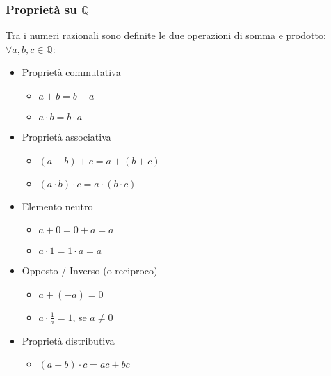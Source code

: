 \documentclass[a4paper,12pt, oneside]{book}
\begin{document}
\subsubsection{Proprietà su $\mathbb{Q}$}
Tra i numeri razionali sono definite le due operazioni di somma e prodotto:\\
$\forall a,b,c\in\mathbb{Q}$:
\begin{itemize}
	\item Proprietà commutativa
	      \begin{itemize}
		      \item $a+b=b+a$
		      \item $a \cdot b=b \cdot a$
	      \end{itemize}
	\item Proprietà associativa
	      \begin{itemize}
		      \item $(a+b)+c=a+(b+c)$
		      \item $(a\cdot b)\cdot c=a\cdot(b\cdot c)$
	      \end{itemize}
	\item Elemento neutro
	      \begin{itemize}
		      \item $a+0=0+a=a$
		      \item $a\cdot 1=1\cdot a=a$
	      \end{itemize}
	\item Opposto / Inverso (o reciproco)
	      \begin{itemize}
		      \item $a+(-a)=0$
		      \item $a\cdot\frac1{a}=1$, se $a\neq0$
	      \end{itemize}
	\item Proprietà distributiva
	      \begin{itemize}
		      \item $(a+b)\cdot c=ac+bc$
	      \end{itemize}
\end{itemize}
\end{document}
